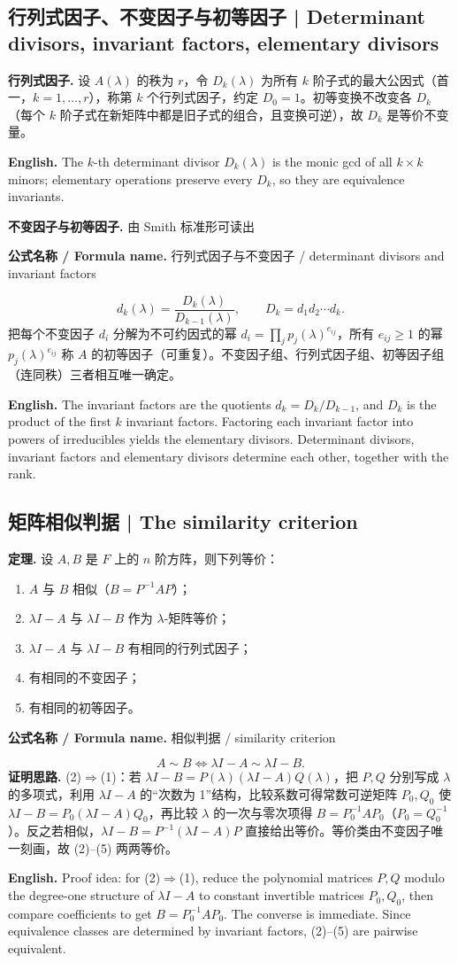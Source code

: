 \documentclass[UTF8,11pt,a4paper]{ctexart}
\newcommand{\EN}[1]{\par\noindent\textbf{English.} #1\par}
\newcommand{\FORMULA}[2]{\par\noindent\textbf{公式名称 / Formula name.} #1 / #2\par}
\begin{document}
\subsection{行列式因子、不变因子与初等因子 | Determinant divisors, invariant factors, elementary divisors}
\noindent\textbf{行列式因子.} 设 $A(\lambda)$ 的秩为 $r$，令 $D_k(\lambda)$ 为所有 $k$ 阶子式的最大公因式（首一，$k=1,\dots,r$），称第 $k$ 个行列式因子，约定 $D_0=1$。初等变换不改变各 $D_k$（每个 $k$ 阶子式在新矩阵中都是旧子式的组合，且变换可逆），故 $D_k$ 是等价不变量。
\EN{The $k$-th determinant divisor $D_k(\lambda)$ is the monic gcd of all $k\times k$ minors; elementary operations preserve every $D_k$, so they are equivalence invariants.}
\noindent\textbf{不变因子与初等因子.} 由 Smith 标准形可读出
\FORMULA{行列式因子与不变因子}{determinant divisors and invariant factors}
\[
d_k(\lambda)=\frac{D_k(\lambda)}{D_{k-1}(\lambda)},\qquad D_k=d_1d_2\cdots d_k.
\]
把每个不变因子 $d_i$ 分解为不可约因式的幂 $d_i=\prod_j p_j(\lambda)^{e_{ij}}$，所有 $e_{ij}\ge1$ 的幂 $p_j(\lambda)^{e_{ij}}$ 称 $A$ 的初等因子（可重复）。不变因子组、行列式因子组、初等因子组（连同秩）三者相互唯一确定。
\EN{The invariant factors are the quotients $d_k=D_k/D_{k-1}$, and $D_k$ is the product of the first $k$ invariant factors. Factoring each invariant factor into powers of irreducibles yields the elementary divisors. Determinant divisors, invariant factors and elementary divisors determine each other, together with the rank.}

\subsection{矩阵相似判据 | The similarity criterion}
\noindent\textbf{定理.} 设 $A,B$ 是 $F$ 上的 $n$ 阶方阵，则下列等价：
\begin{enumerate}[label=(\arabic*),leftmargin=2.4em,itemsep=1pt]
\item $A$ 与 $B$ 相似（$B=P^{-1}AP$）；
\item $\lambda I-A$ 与 $\lambda I-B$ 作为 $\lambda$-矩阵等价；
\item $\lambda I-A$ 与 $\lambda I-B$ 有相同的行列式因子；
\item 有相同的不变因子；
\item 有相同的初等因子。
\end{enumerate}
\FORMULA{相似判据}{similarity criterion}
\[
A\sim B\iff \lambda I-A\sim \lambda I-B.
\]
\noindent\textbf{证明思路.} (2)$\Rightarrow$(1)：若 $\lambda I-B=P(\lambda)(\lambda I-A)Q(\lambda)$，把 $P,Q$ 分别写成 $\lambda$ 的多项式，利用 $\lambda I-A$ 的“次数为 1”结构，比较系数可得常数可逆矩阵 $P_0,Q_0$ 使 $\lambda I-B=P_0(\lambda I-A)Q_0$，再比较 $\lambda$ 的一次与零次项得 $B=P_0^{-1}AP_0$（$P_0=Q_0^{-1}$）。反之若相似，$\lambda I-B=P^{-1}(\lambda I-A)P$ 直接给出等价。等价类由不变因子唯一刻画，故 (2)--(5) 两两等价。
\EN{Proof idea: for (2)$\Rightarrow$(1), reduce the polynomial matrices $P,Q$ modulo the degree-one structure of $\lambda I-A$ to constant invertible matrices $P_0,Q_0$, then compare coefficients to get $B=P_0^{-1}AP_0$. The converse is immediate. Since equivalence classes are determined by invariant factors, (2)--(5) are pairwise equivalent.}
\end{document}
